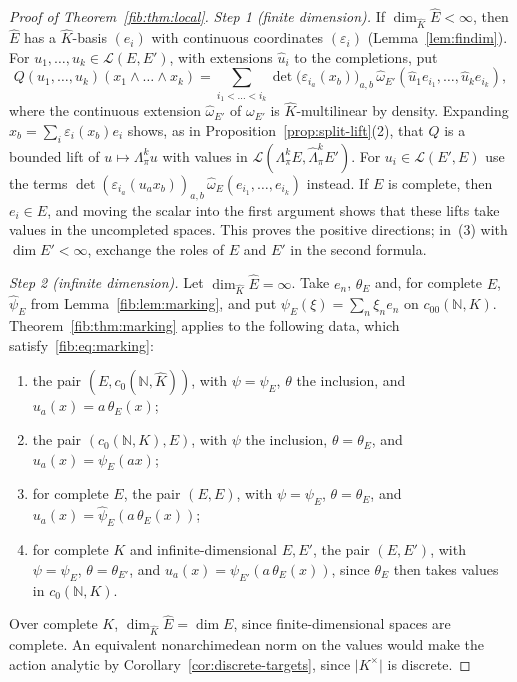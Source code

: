 \documentclass[11pt]{amsart}
\theoremstyle{definition}
\theoremstyle{remark}
\numberwithin{equation}{section}
\newcommand{\N}{\mathbb N}
\newcommand{\cL}{\mathcal L}
\newcommand{\abs}[1]{\lvert #1\rvert}
\newcommand{\Kh}{\widehat K}
\theoremstyle{plain}
\theoremstyle{definition}
\theoremstyle{plain}
\begin{document}
\begin{proof}[Proof of Theorem~\ref{fib:thm:local}]
\emph{Step 1 (finite dimension).} If $\dim_{\Kh}\widehat E<\infty$, then $\widehat E$ has a $\Kh$\nobreakdash-basis
$(e_i)$ with continuous coordinates $(\varepsilon_i)$ (Lemma~\ref{lem:findim}). For $u_1,\dots,u_k\in\cL(E,E')$, with
extensions $\widehat u_i$ to the completions, put
\[
 Q(u_1,\dots,u_k)(x_1\wedge\dots\wedge x_k)=\sum_{i_1<\dots<i_k}\det\bigl(\varepsilon_{i_a}(x_b)\bigr)_{a,b}\,
 \widehat\omega_{E'}(\widehat u_1e_{i_1},\dots,\widehat u_ke_{i_k}),
\]
where the continuous extension $\widehat\omega_{E'}$ of $\omega_{E'}$ is $\Kh$\nobreakdash-multilinear by density.
Expanding $x_b=\sum_i\varepsilon_i(x_b)e_i$ shows, as in Proposition~\ref{prop:split-lift}(2), that $Q$ is a bounded lift
of $u\mapsto\Lambda^k_\pi u$ with values in $\cL(\Lambda^k_\pi E,\widehat\Lambda^k_\pi E')$. For $u_i\in\cL(E',E)$ use the
terms $\det(\varepsilon_{i_a}(u_ax_b))_{a,b}\,\widehat\omega_E(e_{i_1},\dots,e_{i_k})$ instead. If $E$ is complete, then
$e_i\in E$, and moving the scalar into the first argument shows that these lifts take values in the uncompleted spaces.
This proves the positive directions; in~(3) with $\dim E'<\infty$, exchange the roles of $E$ and $E'$ in the second
formula.

\emph{Step 2 (infinite dimension).} Let $\dim_{\Kh}\widehat E=\infty$. Take $e_n$, $\theta_E$ and, for complete $E$,
$\widehat\psi_E$ from Lemma~\ref{fib:lem:marking}, and put $\psi_E(\xi)=\sum_n\xi_ne_n$ on $c_{00}(\N,K)$.
Theorem~\ref{fib:thm:marking} applies to the following data, which satisfy~\eqref{fib:eq:marking}:
\begin{enumerate}
\item[(a)] the pair $(E,c_0(\N,\Kh))$, with $\psi=\psi_E$, $\theta$ the inclusion, and $u_a(x)=a\,\theta_E(x)$;
\item[(b)] the pair $(c_0(\N,K),E)$, with $\psi$ the inclusion, $\theta=\theta_E$, and $u_a(x)=\psi_E(ax)$;
\item[(c)] for complete $E$, the pair $(E,E)$, with $\psi=\psi_E$, $\theta=\theta_E$, and
$u_a(x)=\widehat\psi_E(a\,\theta_E(x))$;
\item[(d)] for complete $K$ and infinite-dimensional $E,E'$, the pair $(E,E')$, with $\psi=\psi_E$,
$\theta=\theta_{E'}$, and $u_a(x)=\psi_{E'}(a\,\theta_E(x))$, since $\theta_E$ then takes values in $c_0(\N,K)$.
\end{enumerate}
Over complete $K$, $\dim_{\Kh}\widehat E=\dim E$, since finite-dimensional spaces are complete. An equivalent
nonarchimedean norm on the values would make the action analytic by Corollary~\ref{cor:discrete-targets}, since
$\abs{K^\times}$ is discrete.
\end{proof}
\end{document}
